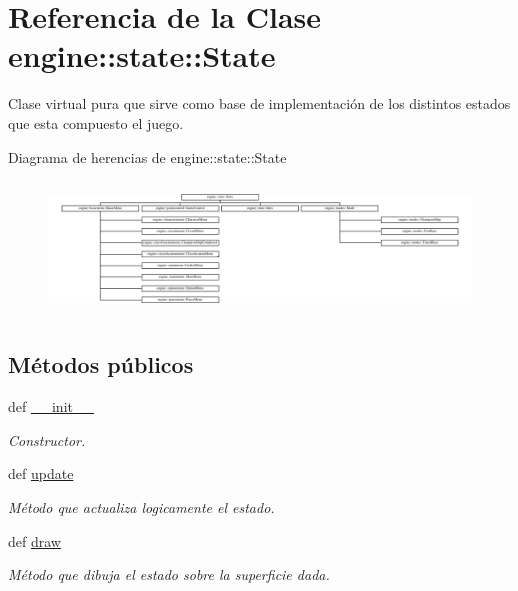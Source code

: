 \hypertarget{classengine_1_1state_1_1State}{
\section{\-Referencia de la \-Clase engine\-:\-:state\-:\-:\-State}
\label{classengine_1_1state_1_1State}
}


\-Clase virtual pura que sirve como base de implementación de los distintos estados que esta compuesto el juego.  


\-Diagrama de herencias de engine\-:\-:state\-:\-:\-State\begin{figure}[H]
\begin{center}
\leavevmode
\includegraphics[height=3.578275cm]{classengine_1_1state_1_1State}
\end{center}
\end{figure}
\subsection*{\-Métodos públicos}
\begin{DoxyCompactItemize}
\item 
def \hyperlink{classengine_1_1state_1_1State_ab0693f83bb6522fe8cc4cbe5dd089f65}{\-\_\-\-\_\-init\-\_\-\-\_\-}
\begin{DoxyCompactList}\small\item\em \-Constructor. \end{DoxyCompactList}\item 
def \hyperlink{classengine_1_1state_1_1State_afd0801bc3828eb26d0331269deaf4ca8}{update}
\begin{DoxyCompactList}\small\item\em \-Método que actualiza logicamente el estado. \end{DoxyCompactList}\item 
def \hyperlink{classengine_1_1state_1_1State_a26fb497a55923aef2cf9f30252b0d1c5}{draw}
\begin{DoxyCompactList}\small\item\em \-Método que dibuja el estado sobre la superficie dada. \end{DoxyCompactList}\end{DoxyCompactItemize}
